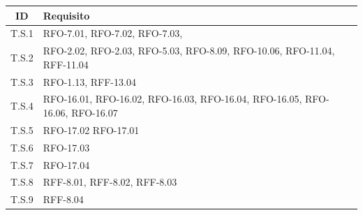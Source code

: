 \begin{tabularx}{\textwidth}{|c|X|}
    \hline
    \textbf{ID} & \textbf{Requisito}\\
    \hline
    \label{ts:trace_ts1}T.S.1 & RFO-7.01, RFO-7.02, RFO-7.03,\\
    \hline
    \label{ts:trace_ts2}T.S.2 & RFO-2.02, RFO-2.03, RFO-5.03, RFO-8.09, RFO-10.06, RFO-11.04, RFF-11.04\\
    \hline
    \label{ts:trace_ts3}T.S.3 & RFO-1.13, RFF-13.04 \\
    \hline
    \label{ts:trace_ts4}T.S.4 & RFO-16.01, RFO-16.02, RFO-16.03, RFO-16.04, RFO-16.05, RFO-16.06, RFO-16.07\\ 
    \hline
    \label{ts:trace_ts5}T.S.5 & RFO-17.02 RFO-17.01\\ 
    \hline
    \label{ts:trace_ts6}T.S.6 & RFO-17.03\\ 
    \hline
    \label{ts:trace_ts7}T.S.7 & RFO-17.04\\ 
    \hline
    \label{ts:trace_ts8}T.S.8 & RFF-8.01, RFF-8.02, RFF-8.03\\ 
    \hline
    \label{ts:trace_ts9}T.S.9 & RFF-8.04\\ 
    \hline
\end{tabularx}


